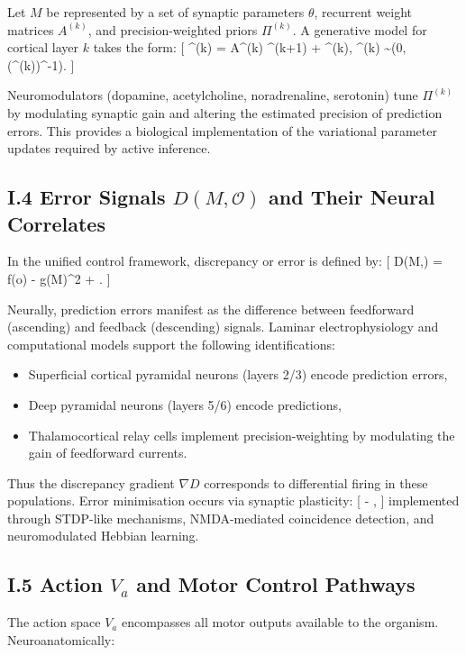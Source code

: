 \documentclass[11pt,a4paper,twoside]{article}
\begin{document}
Let $M$ be represented by a set of synaptic parameters $\theta$, recurrent weight matrices $A^{(k)}$, and precision-weighted priors $\Pi^{(k)}$. A generative model for cortical layer $k$ takes the form:
[
^{(k)} = A^{(k)} ^{(k+1)} + \epsilon^{(k)}, \qquad
\epsilon^{(k)} \sim {}\big(0,(\Pi^{(k)})^{-1}\big).
]

Neuromodulators (dopamine, acetylcholine, noradrenaline, serotonin) tune $\Pi^{(k)}$ by modulating synaptic gain and altering the estimated precision of prediction errors. This provides a biological implementation of the variational parameter updates required by active inference.

\subsection*{I.4 Error Signals $D(M,\mathcal{O})$ and Their Neural Correlates}

In the unified control framework, discrepancy or error is defined by:
[
D(M,) = \lVert f(o) - g(M)\rVert^2 + .
]

Neurally, prediction errors manifest as the difference between feedforward (ascending) and feedback (descending) signals. Laminar electrophysiology and computational models support the following identifications:

\begin{itemize}
\item Superficial cortical pyramidal neurons (layers 2/3) encode prediction errors,
\item Deep pyramidal neurons (layers 5/6) encode predictions,
\item Thalamocortical relay cells implement precision-weighting by modulating the gain of feedforward currents.
\end{itemize}

Thus the discrepancy gradient $\nabla D$ corresponds to differential firing in these populations. Error minimisation occurs via synaptic plasticity:
[
\Delta \theta \propto - \eta {},
]
implemented through STDP-like mechanisms, NMDA-mediated coincidence detection, and neuromodulated Hebbian learning.

\subsection*{I.5 Action $V_a$ and Motor Control Pathways}

The action space $V_a$ encompasses all motor outputs available to the organism. Neuroanatomically:
\end{document}
